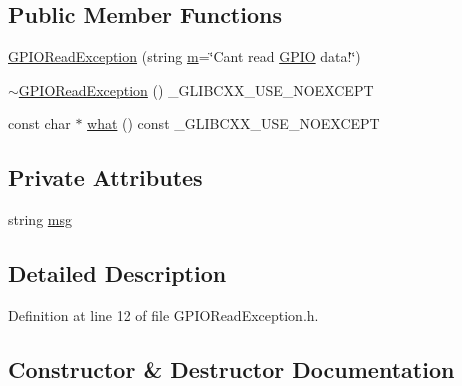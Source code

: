 \subsection*{Public Member Functions}
\begin{DoxyCompactItemize}
\item 
\hyperlink{class_hardware_1_1_exception_1_1_g_p_i_o_read_exception_a689a2d0cefc6eb5528ad6e7200fbf5f5}{G\+P\+I\+O\+Read\+Exception} (string \hyperlink{_gen_blob_8m_ab3cd915d758008bd19d0f2428fbb354a}{m}=\char`\"{}Can\textquotesingle{}t read \hyperlink{class_hardware_1_1_g_p_i_o}{G\+P\+I\+O} data!\char`\"{})
\item 
\hyperlink{class_hardware_1_1_exception_1_1_g_p_i_o_read_exception_a97a5da2dc97609b2168a53f52589a0fb}{$\sim$\+G\+P\+I\+O\+Read\+Exception} () \+\_\+\+G\+L\+I\+B\+C\+X\+X\+\_\+\+U\+S\+E\+\_\+\+N\+O\+E\+X\+C\+E\+P\+T
\item 
const char $\ast$ \hyperlink{class_hardware_1_1_exception_1_1_g_p_i_o_read_exception_a45c94f4cf40537716cf7c0acfe3ebe29}{what} () const \+\_\+\+G\+L\+I\+B\+C\+X\+X\+\_\+\+U\+S\+E\+\_\+\+N\+O\+E\+X\+C\+E\+P\+T
\end{DoxyCompactItemize}
\subsection*{Private Attributes}
\begin{DoxyCompactItemize}
\item 
string \hyperlink{class_hardware_1_1_exception_1_1_g_p_i_o_read_exception_a51fe12853bc4ee2ef0f6cabd117b844e}{msg}
\end{DoxyCompactItemize}


\subsection{Detailed Description}


Definition at line 12 of file G\+P\+I\+O\+Read\+Exception.\+h.



\subsection{Constructor \& Destructor Documentation}
\hypertarget{class_hardware_1_1_exception_1_1_g_p_i_o_read_exception_a689a2d0cefc6eb5528ad6e7200fbf5f5}{}

